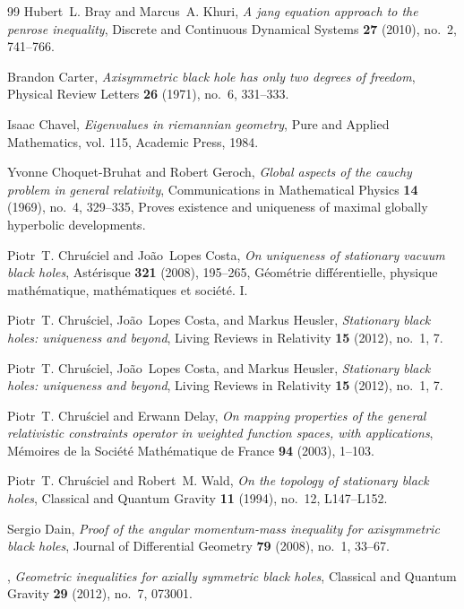 \documentclass[12pt]{article}
\theoremstyle{plain}
\theoremstyle{definition}
\theoremstyle{remark}
\begin{document}
\begin{thebibliography}{99}
Hubert~L. Bray and Marcus~A. Khuri, \emph{A jang equation approach to the
  penrose inequality}, Discrete and Continuous Dynamical Systems \textbf{27}
  (2010), no.~2, 741--766.

Brandon Carter, \emph{Axisymmetric black hole has only two degrees of freedom},
  Physical Review Letters \textbf{26} (1971), no.~6, 331--333.

Isaac Chavel, \emph{Eigenvalues in riemannian geometry}, Pure and Applied
  Mathematics, vol. 115, Academic Press, 1984.

Yvonne Choquet-Bruhat and Robert Geroch, \emph{Global aspects of the cauchy
  problem in general relativity}, Communications in Mathematical Physics
  \textbf{14} (1969), no.~4, 329--335, Proves existence and uniqueness of
  maximal globally hyperbolic developments.

Piotr~T. Chru\'sciel and Jo\~ao~Lopes Costa, \emph{On uniqueness of stationary
  vacuum black holes}, Ast\'erisque \textbf{321} (2008), 195--265,
  G\'eom\'etrie diff\'erentielle, physique math\'ematique, math\'ematiques et
  soci\'et\'e. I.

Piotr~T. Chru\'sciel, Jo\~ao~Lopes Costa, and Markus Heusler, \emph{Stationary
  black holes: uniqueness and beyond}, Living Reviews in Relativity \textbf{15}
  (2012), no.~1, 7.

Piotr~T. Chru\'sciel, Jo\~ao~Lopes Costa, and Markus Heusler, \emph{Stationary
  black holes: uniqueness and beyond}, Living Reviews in Relativity \textbf{15}
  (2012), no.~1, 7.

Piotr~T. Chru\'sciel and Erwann Delay, \emph{On mapping properties of the
  general relativistic constraints operator in weighted function spaces, with
  applications}, M\'emoires de la Soci\'et\'e Math\'ematique de France
  \textbf{94} (2003), 1--103.

Piotr~T. Chru\'sciel and Robert~M. Wald, \emph{On the topology of stationary black holes}, Classical and Quantum Gravity \textbf{11} (1994), no.~12, L147--L152.

Sergio Dain, \emph{Proof of the angular momentum-mass inequality for
  axisymmetric black holes}, Journal of Differential Geometry \textbf{79}
  (2008), no.~1, 33--67.

\bysame, \emph{Geometric inequalities for axially symmetric black holes},
  Classical and Quantum Gravity \textbf{29} (2012), no.~7, 073001.


\end{thebibliography}
\end{document}
